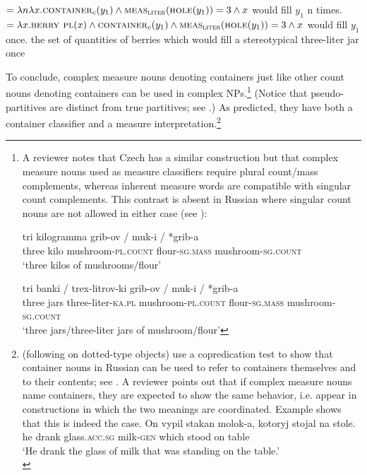 \documentclass[output=paper,
colorlinks,
citecolor=brown,
newtxmath
]{langscibook}
\begin{document}
\ea\label{ex:34}
    \ea {} $= \lambda n \lambda x.\textsc{container}_{c}(y_1) \wedge \textsc{meas}_{\textsc{liter}}(\textsc{hole}(y_1)) = 3 \wedge x$ would fill $y_1$ n times.
    \ex {} $= \lambda x.\textsc{berry pl}(x) \wedge \textsc{container}_{c}(y_1) \wedge \textsc{meas}_{\textsc{liter}}(\textsc{hole}(y_1)) = 3 \wedge x$ would fill $y_1$ once.
    \z
{\small the set of quantities of berries which would fill a stereotypical three-liter jar once}
\z

    \largerpage[3] %

\noindent To conclude, complex measure nouns denoting containers just like other count nouns denoting containers can be used in complex NPs.\footnote{A reviewer notes that Czech has a similar construction but that complex measure nouns used as measure classifiers require plural count/mass complements, whereas inherent measure words are compatible with singular count complements. This contrast is absent in Russian where singular count nouns are not allowed in either case (see \citealt{Khrizman2014, Khrizman2016a}):

    \ea \gll tri kilogramma grib-ov / muk-i / *grib-a \\
    three kilo mushroom-\textsc{pl.count} {} flour-\textsc{sg.mass} {} \phantom{*}mushroom-\textsc{sg.count}\\
    \glt `three kilos of mushrooms/flour'
    \z

    \ea \gll tri banki / trex-litrov-ki grib-ov / muk-i / *grib-a \\
    three jars {} three-liter-\textsc{ka.pl} mushroom-\textsc{pl.count} {} flour-\textsc{sg.mass} {} \phantom{*}mushroom-\textsc{sg.count}\\
    \glt `three jars/three-liter jars of mushroom/flour'
    \z
    } (Notice that pseudo-partitives are distinct from true partitives; see \citealt{Koptjevskaja-Tamm2011}.) As predicted, they have both a container classifier and a measure interpretation.\footnote{\citet{Partee.Borschev2012} (following \citealt{Pustejovsky1993} on dotted-type objects) use a copredication test to show that container nouns in Russian can be used to refer to containers themselves and to their contents; see . A reviewer points out that if complex measure nouns name containers, they are expected to show the same behavior, i.e. appear in constructions in which the two meanings are coordinated. Example  shows that this is indeed the case.
    \ea\label{f:3} \gll On vypil stakan molok-a, kotoryj stojal na stole.\\
    he drank glass.\textsc{acc.sg} milk-\textsc{gen} which stood on table\\
    \glt `He drank the glass of milk that was standing on the table.'\\
    \glt \hfill \citep[459]{Partee.Borschev2012}
    \z

}
\end{document}

